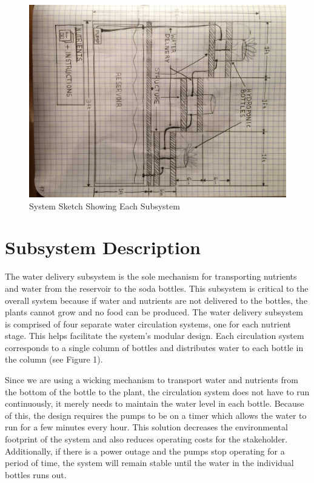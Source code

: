 \documentclass[12pt]{article}
\begin{document}
{    \pagebreak
    \begin{figure}[H]
        \centering
        \includegraphics[width=163mm]{resources/system-overview.jpg}
        \caption{System Sketch Showing Each Subsystem}
    \end{figure}
}


\section{Subsystem Description}


The water delivery subsystem is the sole mechanism for transporting nutrients and water from
the reservoir to the soda bottles. This subsystem is critical to the overall system because if water
and nutrients are not delivered to the bottles, the plants cannot grow and no food can be produced.
The water delivery subsystem is comprised of four separate water circulation systems, one for each
nutrient stage. This helps facilitate the system's modular design. Each circulation system
corresponds to a single column of bottles and distributes water to each bottle in the column (see
Figure 1).

Since we are using a wicking mechanism to transport water and nutrients from the bottom of the
bottle to the plant, the circulation system does not have to run continuously, it merely needs to
maintain the water level in each bottle. Because of this, the design requires the pumps to be on a
timer which allows the water to run for a few minutes every hour. This solution decreases the
environmental footprint of the system and also reduces operating costs for the stakeholder.
Additionally, if there is a power outage and the pumps stop operating for a period of time, the
system will remain stable until the water in the individual bottles runs out.
\end{document}
